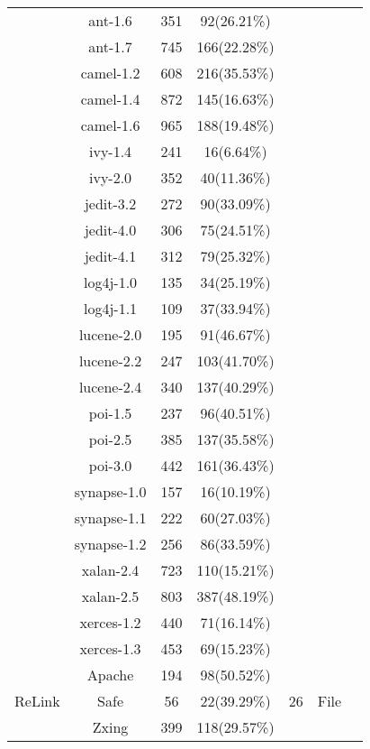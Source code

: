 \begin{table*}[t!]
{\begin{tabular}{|c|c|c|c|c|c|c}
 & ant-1.6 & 351 & 92(26.21\%) &  &  &  \\ \cline{2-4}
 & ant-1.7 & 745 & 166(22.28\%) &  &  &  \\ \cline{2-4}
 & camel-1.2 & 608 & 216(35.53\%) &  &  &  \\ \cline{2-4}
 & camel-1.4 & 872 & 145(16.63\%) &  &  &  \\ \cline{2-4}
 & camel-1.6 & 965 & 188(19.48\%) &  &  &  \\ \cline{2-4}
 & ivy-1.4 & 241 & 16(6.64\%) &  &  &  \\ \cline{2-4}
 & ivy-2.0 & 352 & 40(11.36\%) &  &  &  \\ \cline{2-4}
 & jedit-3.2 & 272 & 90(33.09\%) &  &  &  \\ \cline{2-4}
 & jedit-4.0 & 306 & 75(24.51\%) &  &  &  \\ \cline{2-4}
 & jedit-4.1 & 312 & 79(25.32\%) &  &  &  \\ \cline{2-4}
 & log4j-1.0 & 135 & 34(25.19\%) &  &  &  \\ \cline{2-4}
 & log4j-1.1 & 109 & 37(33.94\%) &  &  &  \\ \cline{2-4}
 & lucene-2.0 & 195 & 91(46.67\%) &  &  &  \\ \cline{2-4}
 \cite{ghotra2017msr} & lucene-2.2 & 247 & 103(41.70\%) &  &  &  \\ \cline{2-4}
 & lucene-2.4 & 340 & 137(40.29\%) &  &  &  \\ \cline{2-4}
 & poi-1.5 & 237 & 96(40.51\%) &  &  &  \\ \cline{2-4}
 & poi-2.5 & 385 & 137(35.58\%) &  &  &  \\ \cline{2-4}
 & poi-3.0 & 442 & 161(36.43\%) &  &  &  \\ \cline{2-4}
 & synapse-1.0 & 157 & 16(10.19\%) &  &  &  \\ \cline{2-4}
 & synapse-1.1 & 222 & 60(27.03\%) &  &  &  \\ \cline{2-4}
 & synapse-1.2 & 256 & 86(33.59\%) &  &  &  \\ \cline{2-4}
 & xalan-2.4 & 723 & 110(15.21\%) &  &  &  \\ \cline{2-4}
 & xalan-2.5 & 803 & 387(48.19\%) &  &  &  \\ \cline{2-4}
 & xerces-1.2 & 440 & 71(16.14\%) &  &  &  \\ \cline{2-4}
 & xerces-1.3 & 453 & 69(15.23\%) &  &  &  \\ \cline{1-6}
\multirow{3}{*}{ReLink} & Apache & 194 & 98(50.52\%) & \multirow{3}{*}{26} & \multirow{3}{*}{File} &  \\ \cline{2-4}
 & Safe & 56 & 22(39.29\%) &  &  &  \\ \cline{2-4}
 \cite{Wu2011FSEReLink} & Zxing & 399 & 118(29.57\%) &  &  &  \\ \cline{1-6}
\end{tabular}%
}
\end{table*}